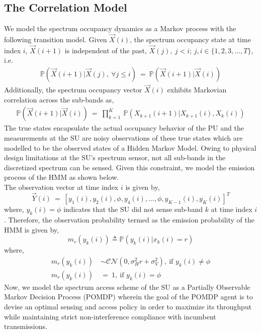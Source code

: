 \documentclass[12pt, draftcls, onecolumn]{IEEEtran}
\begin{document}
\subsection{The Correlation Model}
We model the spectrum occupancy dynamics as a Markov process with the following transition model. Given $\vec{X}(i)$, the spectrum occupancy state at time index $i$, $\vec{X}(i+1)$ is independent of the past, $\vec{X}(j),\ j < i$; $j, i \in \{1,2,3,...,T\}$, i.e.
\begin{equation}\label{4}
    \begin{aligned}
        \mathbb{P}(\vec{X}(i+1)|\vec{X}(j),\ \forall j \leq i)\ =\ \mathbb{P}(\vec{X}(i+1)|\vec{X}(i))
    \end{aligned}
\end{equation}
Additionally, the spectrum occupancy vector $\vec{X}(i)$ exhibits Markovian correlation across the sub-bands as,
\begin{equation}\label{5}
    \begin{aligned}
         \mathbb{P}(\vec{X}(i+1)|\vec{X}(i))\ =\ 
         \prod_{k=1}^K\ \mathbb{P}(X_{k+1}(i+1)|X_{k+1}(i),X_{k}(i))
    \end{aligned}
\end{equation}
The true states encapsulate the actual occupancy behavior of the PU and the measurements at the SU are noisy observations of these true states which are modelled to be the observed states of a Hidden Markov Model. Owing to physical design limitations at the SU's spectrum sensor, not all sub-bands in the discretized spectrum can be sensed. Given this constraint, we model the emission process of the HMM as shown below.
\\The observation vector at time index $i$ is given by,
\begin{equation}\label{6}
    \vec{Y}(i)\ =\ [y_1(i),y_2(i),\phi,y_4(i),...,\phi,y_{K-1}(i),y_K(i)]^T
\end{equation}
where, $y_k(i) = \phi$ indicates that the SU did not sense sub-band $k$ at time index $i$. Therefore, the observation probability termed as the emission probability of the HMM is given by,
\begin{equation*}
    m_r(y_k(i)) \triangleq \mathbb{P}(y_k(i)|x_k(i)=r)
\end{equation*}
where,
\begin{equation}\label{7}
    \begin{aligned}
        m_r(y_k(i))\ &\sim \mathcal{CN}(0,\sigma_H^2r+\sigma_V^2),\ \text{if $y_k(i) \not = \phi$} \\
        m_r(y_k(i))\ &=\ 1,\ \text{if $y_k(i) = \phi$}
    \end{aligned}
\end{equation}
Now, we model the spectrum access scheme of the SU as a Partially Observable Markov Decision Process (POMDP) wherein the goal of the POMDP agent is to devise an optimal sensing and access policy in order to maximize its throughput while maintaining strict non-interference compliance with incumbent transmissions.
\end{document}
